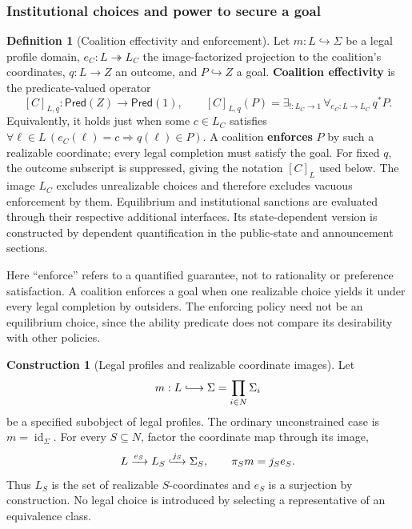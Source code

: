 \documentclass[11pt,a4paper]{article}
\numberwithin{equation}{section}
\theoremstyle{definition}
\newtheorem{definition}[theorem]{Definition}
\newtheorem{construction}[construction]{Construction}
\theoremstyle{remark}
\theoremstyle{plain}
\begin{document}
\subsubsection{Institutional choices and power to secure a goal}

\begin{definition}[Coalition effectivity and enforcement]
\label{def:egt-effectivity-vocabulary}
Let $m:L\hookrightarrow\Sigma$ be a legal profile domain,
$e_C:L\twoheadrightarrow L_C$ the image-factorized projection to the
coalition's coordinates, $q:L\to Z$ an outcome, and
$P\hookrightarrow Z$ a goal. \textbf{Coalition effectivity} is the
predicate-valued operator
\[
 [C]_{L,q}:\mathsf{Pred}(Z)\longrightarrow\mathsf{Pred}(1),
 \qquad [C]_{L,q}(P)=
 \exists_{!:L_C\to1}\,\forall_{e_C:L\to L_C}\,q^*P.
\]
Equivalently, it holds just when some $c\in L_C$ satisfies
$\forall\ell\in L\,(e_C(\ell)=c\Rightarrow q(\ell)\in P)$.
A coalition \textbf{enforces} $P$ by such a realizable coordinate;
every legal completion must satisfy the goal. For fixed $q$, the
outcome subscript is suppressed, giving the notation $[C]_L$ used below. The image $L_C$ excludes
unrealizable choices and therefore excludes vacuous enforcement by them.
Equilibrium and institutional sanctions are evaluated through their respective additional interfaces.
Its state-dependent version is constructed by dependent quantification
in the public-state and announcement sections.
\end{definition}
Here ``enforce'' refers to a quantified guarantee, not to
rationality or preference satisfaction. A coalition enforces a goal when
one realizable choice yields it under every legal completion by outsiders.
The enforcing policy need not be an equilibrium choice, since the
ability predicate does not compare its desirability with other policies.

\begin{construction}[Legal profiles and realizable coordinate images]
Let
\[
 m:L\lhook\joinrel\longrightarrow
 \Sigma=\prod_{i\in N}\Sigma_i
\]
be a specified subobject of legal profiles. The ordinary unconstrained case is
$m=\operatorname{id}_\Sigma$. For every $S\subseteq N$, factor the coordinate
map through its image,
\begin{equation}
\label{eq:egt-legal-coordinate-image}
 L\xrightarrow{e_S}L_S
 \lhook\joinrel\xrightarrow{j_S}\Sigma_S,
 \qquad
 \pi_Sm=j_Se_S.
\end{equation}
Thus $L_S$ is the set of realizable $S$-coordinates and $e_S$ is a
surjection by construction. No legal choice is introduced by selecting a
representative of an equivalence class.
\end{construction}
\end{document}

